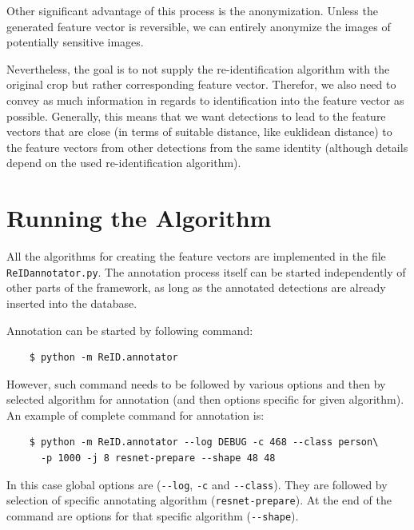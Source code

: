 Other significant advantage of this process is the anonymization. Unless the generated
feature vector is reversible, we can entirely anonymize the images of potentially
sensitive images.

Nevertheless, the goal is to not supply the re-identification algorithm with the original
crop but rather corresponding feature vector. Therefor, we also need to convey
as much information in regards to identification into the feature vector as possible.
Generally, this means that we want detections to lead to the feature vectors that are
close (in terms of suitable distance, like euklidean distance) to the feature vectors
from other detections from the same identity (although details depend on the 
used re-identification algorithm).

\section{Running the Algorithm}
\label{sec:running_annotator}

All the algorithms for creating the feature vectors are implemented in the file
\texttt{ReID\/annotator.py}. The annotation process itself can be started independently
of other parts of the framework, as long as the annotated detections are already
inserted into the database.

Annotation can be started by following command:
\begin{verbatim}
    $ python -m ReID.annotator
\end{verbatim}
However, such command needs to be followed by various options and then by selected
algorithm for annotation (and then options specific for given algorithm). An example of 
complete command for annotation is:
\begin{verbatim}
    $ python -m ReID.annotator --log DEBUG -c 468 --class person\
      -p 1000 -j 8 resnet-prepare --shape 48 48
\end{verbatim}

In this case global options are (\verb+--log+, \verb+-c+ and \verb+--class+). They are 
followed by selection of specific annotating algorithm (\verb+resnet-prepare+). At 
the end of the command are options for that specific algorithm (\verb+--shape+).

